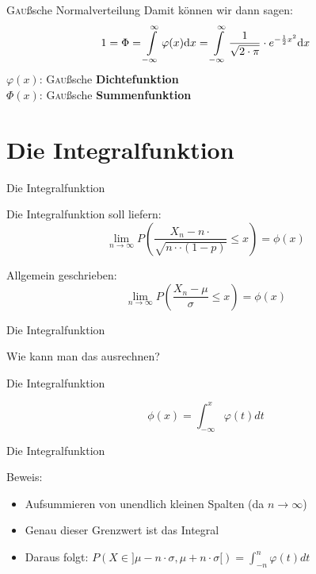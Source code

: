 \documentclass[14pt]{beamer}
\begin{document}
\begin{frame}{\textrm{\textsc{Gau}ß}sche Normalverteilung}
Damit können wir dann sagen:
$$
1= \Phi =  \int\displaylimits^{\infty}_{-\infty} \varphi(x) {\mathrm d}x = \int\displaylimits^{\infty}_{-\infty} \frac{1}{\sqrt{2\cdot \pi}} \cdot e^{-\frac{1}{2}x^2} {\mathrm d}x
$$
$\varphi(x)$: \textrm{\textsc{Gau}ß}sche \textbf{Dichtefunktion}\\
$\Phi(x)$:  \textrm{\textsc{Gau}ß}sche \textbf{Summenfunktion}
\end{frame}

\section{Die Integralfunktion}
\begin{frame} {Die Integralfunktion}

Die Integralfunktion soll liefern:
$$ \lim_{n \rightarrow \infty} P\left(\frac{X_n-n\cdotp}{\sqrt{n\cdotp\cdot(1-p)}} \le x\right) = \phi(x) $$

Allgemein geschrieben:
$$ \lim_{n \rightarrow \infty} P\left(\frac{X_n-\mu}{\sigma} \le x\right) = \phi(x) $$

\end{frame}

\begin{frame} {Die Integralfunktion}

Wie kann man das ausrechnen?

\end{frame}

\begin{frame} {Die Integralfunktion}

$$ \phi(x) = \int_{-\infty}^x \varphi(t)dt $$

\end{frame}

\begin{frame} {Die Integralfunktion}

Beweis:

 \begin{itemize}
  \item Aufsummieren von unendlich kleinen Spalten (da $n \rightarrow   \infty$)
  \item Genau dieser Grenzwert ist das Integral
  \item Daraus folgt: $ P(X \in ] \mu - n \cdot \sigma, \mu + n \cdot \sigma[) = \int_{-n}^{n}\varphi(t)dt $
 \end{itemize}

\end{frame}
\end{document}
